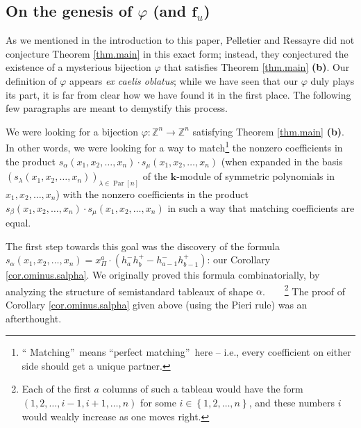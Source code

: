 \documentclass[numbers=enddot,12pt,final,onecolumn,notitlepage]{scrartcl}%
\theoremstyle{definition}
\begin{document}
\subsection{On the genesis of $\varphi$ (and $\mathbf{f}_{u}$)}

As we mentioned in the introduction to this paper, Pelletier and Ressayre did
not conjecture Theorem \ref{thm.main} in this exact form; instead, they
conjectured the existence of a mysterious bijection $\varphi$ that satisfies
Theorem \ref{thm.main} \textbf{(b)}. Our definition of $\varphi$ appears
\textit{ex caelis oblatus}; while we have seen that our $\varphi$ duly plays
its part, it is far from clear how we have found it in the first place. The
following few paragraphs are meant to demystify this process.

We were looking for a bijection $\varphi:\mathbb{Z}^{n}\rightarrow
\mathbb{Z}^{n}$ satisfying Theorem \ref{thm.main} \textbf{(b)}. In other
words, we were looking for a way to match\footnote{\textquotedblleft
Matching\textquotedblright\ means \textquotedblleft perfect
matching\textquotedblright\ here -- i.e., every coefficient on either side
should get a unique partner.} the nonzero coefficients in the product
$s_{\alpha}\left(  x_{1},x_{2},\ldots,x_{n}\right)  \cdot s_{\mu}\left(
x_{1},x_{2},\ldots,x_{n}\right)  $ (when expanded in the basis $\left(
s_{\lambda}\left(  x_{1},x_{2},\ldots,x_{n}\right)  \right)  _{\lambda
\in\operatorname*{Par}\left[  n\right]  }$ of the $\mathbf{k}$-module of
symmetric polynomials in $x_{1},x_{2},\ldots,x_{n}$) with the nonzero
coefficients in the product $s_{\beta}\left(  x_{1},x_{2},\ldots,x_{n}\right)
\cdot s_{\mu}\left(  x_{1},x_{2},\ldots,x_{n}\right)  $ in such a way that
matching coefficients are equal.

The first step towards this goal was the discovery of the formula $s_{\alpha
}\left(  x_{1},x_{2},\ldots,x_{n}\right)  =x_{\Pi}^{a}\cdot\left(  h_{a}%
^{-}h_{b}^{+}-h_{a-1}^{-}h_{b-1}^{+}\right)  $: our Corollary
\ref{cor.ominus.salpha}. We originally proved this formula combinatorially, by
analyzing the structure of semistandard tableaux of shape $\alpha
$.\ \ \ \ \footnote{Each of the first $a$ columns of such a tableau would have
the form $\left(  1,2,\ldots,i-1,i+1,\ldots,n\right)  $ for some $i\in\left\{
1,2,\ldots,n\right\}  $, and these numbers $i$ would weakly increase as one
moves right.} The proof of Corollary \ref{cor.ominus.salpha} given above
(using the Pieri rule) was an afterthought.
\end{document}
